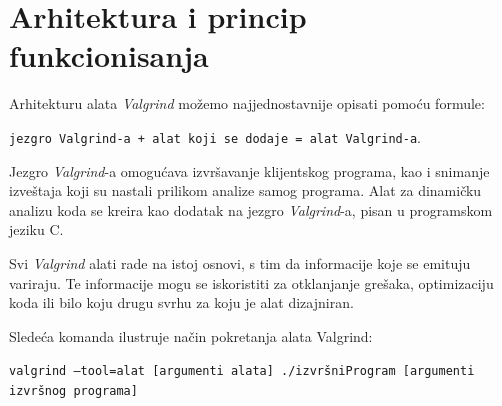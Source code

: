 \documentclass[12pt,oneside]{memoir}
\theoremstyle{plain}
\theoremstyle{definition}
\begin{document}
\section{Arhitektura i princip funkcionisanja}
Arhitekturu alata \textit{Valgrind} možemo najjednostavnije opisati pomoću formule:
\begin{center}
\texttt{jezgro Valgrind-a + alat koji se dodaje = alat Valgrind-a}.
\end{center}

Jezgro \textit{Valgrind}-a omogućava izvršavanje klijentskog programa, kao i snimanje izveštaja koji su nastali prilikom analize samog programa. Alat za dinamičku analizu koda se kreira kao dodatak na jezgro \textit{Valgrind}-a, pisan u programskom jeziku C.


Svi \textit{Valgrind} alati rade na istoj osnovi, s tim da informacije koje se emituju variraju. Te informacije mogu se iskoristiti za otklanjanje grešaka, optimizaciju koda ili bilo koju drugu svrhu za koju je alat dizajniran.

Sledeća komanda ilustruje način pokretanja alata Valgrind:
\begin{center}
\texttt{valgrind --tool=alat [argumenti alata] ./izvršniProgram [argumenti izvršnog programa]}
\end{center}
\end{document}

